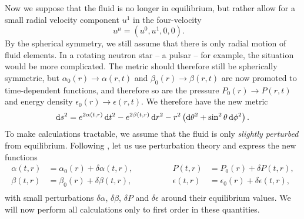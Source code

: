 Now we suppose that the fluid is no longer in equilibrium, but rather allow for a small radial velocity component $u^1$ in the four-velocity
\begin{equation}
	u^\mu = (u^0, u^1, 0, 0) .
	\quad
\label{eq:nstars:velocity_unstable}
\end{equation}
By the spherical symmetry, we still assume that there is only radial motion of fluid elements.
In a rotating neutron star -- a pulsar -- for example, the situation would be more complicated.
The metric should therefore still be spherically symmetric, but $\alpha_0(r) \rightarrow \alpha(r,t)$ and $\beta_0(r) \rightarrow \beta(r,t)$ are now promoted to time-dependent functions, and therefore so are the pressure $P_0(r) \rightarrow P(r,t)$ and energy density $\epsilon_0(r) \rightarrow \epsilon(r,t)$.
We therefore have the new metric
\begin{equation}
	\mathop{}\!\mathrm{d} s^2 = e^{2 \alpha(t, r)} \mathop{}\!\mathrm{d} t^2 - e^{2 \beta(t, r)} \mathop{}\!\mathrm{d} r^2 - r^2 \left( \mathop{}\!\mathrm{d} \theta^2 + \sin^2 \theta \mathop{}\!\mathrm{d} \phi^2 \right) .
\label{eq:nstars:metric_unstable}
\end{equation}
To make calculations tractable, we assume that the fluid is only \emph{slightly perturbed} from equilibrium.
Following \cite{ref:chandrasekhar_stability}, let us use perturbation theory and express the new functions
\begin{equation}
\begin{aligned}
	\alpha   (t, r) &= \alpha_0  (r) + \delta \alpha  (t, r), & \qquad \qquad
	P        (t, r) &= P_0       (r) + \delta P       (t, r), \\
	\beta    (t, r) &= \beta_0   (r) + \delta \beta   (t, r), & \qquad \qquad
	\epsilon (t, r) &= \epsilon_0(r) + \delta \epsilon(t, r), \\
\end{aligned}
\label{eq:nstars:perturbation_expansion}
\end{equation}
with small perturbations $\delta \alpha$, $\delta \beta$, $\delta P$ and $\delta \epsilon$ around their equilibrium values.
We will now perform all calculations only to first order in these quantities.

